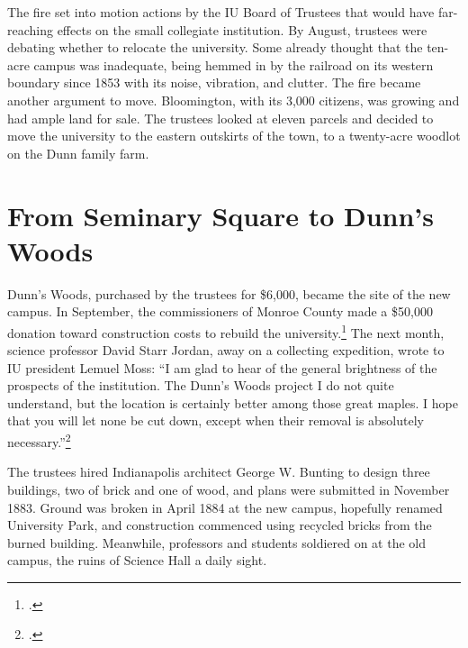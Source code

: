 \documentclass[
  american,
  letterpaper,
]{scrreprt}
\begin{document}
The fire set into motion actions by the IU Board of Trustees that would
have far-reaching effects on the small collegiate institution. By
August, trustees were debating whether to relocate the university. Some
already thought that the ten-acre campus was inadequate, being hemmed in
by the railroad on its western boundary since 1853 with its noise,
vibration, and clutter. The fire became another argument to move.
Bloomington, with its 3,000 citizens, was growing and had ample land for
sale. The trustees looked at eleven parcels and decided to move the
university to the eastern outskirts of the town, to a twenty-acre
woodlot on the Dunn family farm.

\section{From Seminary Square to Dunn's
Woods}\label{from-seminary-square-to-dunns-woods}

Dunn's Woods, purchased by the trustees for \$6,000, became the site of
the new campus. In September, the commissioners of Monroe County made a
\$50,000 donation toward construction costs to rebuild the
university.\footnote{.} The next month,
science professor David Starr Jordan, away on a collecting expedition,
wrote to IU president Lemuel Moss: ``I am glad to hear of the general
brightness of the prospects of the institution. The Dunn's Woods project
I do not quite understand, but the location is certainly better among
those great maples. I hope that you will let none be cut down, except
when their removal is absolutely necessary.''\footnote{.}

The trustees hired Indianapolis architect George W. Bunting to design
three buildings, two of brick and one of wood, and plans were submitted
in November 1883. Ground was broken in April 1884 at the new campus,
hopefully renamed University Park, and construction commenced using
recycled bricks from the burned building. Meanwhile, professors and
students soldiered on at the old campus, the ruins of Science Hall a
daily sight.
\end{document}
